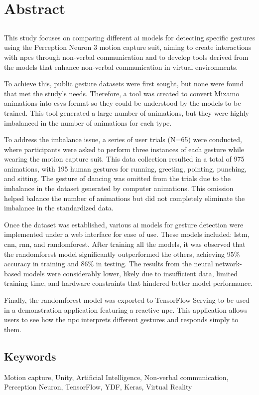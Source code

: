\chapter*{Abstract}

\section*{\tituloPortadaEngVal}
 
This study focuses on comparing different \gls{ai} models for detecting specific gestures using the Perception Neuron 3 motion capture suit, aiming to create interactions with \glspl{npc} through non-verbal communication and to develop tools derived from the models that enhance non-verbal communication in virtual environments.

To achieve this, public gesture datasets were first sought, but none were found that met the study's needs. Therefore, a tool was created to convert Mixamo animations into \glspl{csv} format so they could be understood by the models to be trained. This tool generated a large number of animations, but they were highly imbalanced in the number of animations for each type.

To address the imbalance issue, a series of user trials (N=65) were conducted, where participants were asked to perform three instances of each gesture while wearing the motion capture suit. This data collection resulted in a total of 975 animations, with 195 human gestures for running, greeting, pointing, punching, and sitting. The gesture of dancing was omitted from the trials due to the imbalance in the dataset generated by computer animations. This omission helped balance the number of animations but did not completely eliminate the imbalance in the standardized data.

Once the dataset was established, various \gls{ai} models for gesture detection were implemented under a web interface for ease of use. These models included: \gls{lstm}, \gls{cnn}, \gls{rnn}, and \gls{randomforest}. After training all the models, it was observed that the \gls{randomforest} model significantly outperformed the others, achieving 95\% accuracy in training and 86\% in testing. The results from the neural network-based models were considerably lower, likely due to insufficient data, limited training time, and hardware constraints that hindered better model performance.

Finally, the \gls{randomforest} model was exported to TensorFlow Serving to be used in a demonstration application featuring a reactive \gls{npc}. This application allows users to see how the \gls{npc} interprets different gestures and responds simply to them.
\section*{Keywords}

\noindent Motion capture, Unity, Artificial Intelligence, Non-verbal communication, Perception Neuron, TensorFlow, YDF, Keras, Virtual Reality



